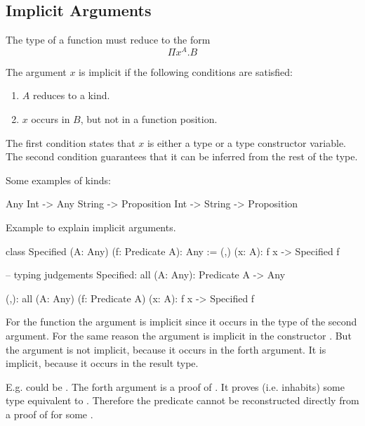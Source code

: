 \subsection{Implicit Arguments}


The type of a function must reduce to the form
$$
    \Pi x^A. B
$$

The argument $x$ is implicit if the following conditions are satisfied:

\begin{enumerate}

\item $A$ reduces to a kind.

\item $x$ occurs in $B$, but not in a function position.
\end{enumerate}

The first condition states that $x$ is either a type or a type constructor
variable. The second condition guarantees that it can be inferred from the rest
of the type.

\noindent Some examples of kinds:
\begin{alba}
    Any
    Int -> Any
    String -> Proposition
    Int -> String -> Proposition
\end{alba}


\noindent Example to explain implicit arguments.
\begin{alba}
class
    Specified (A: Any) (f: Predicate A): Any
:=
    (,) (x: A): f x -> Specified f

-- typing judgements
Specified: all (A: Any): Predicate A -> Any

(,): all (A: Any) (f: Predicate A) (x: A): f x -> Specified f
\end{alba}

For the function  the argument  is implicit since it
occurs in the type of the second argument. For the same reason the argument
 is implicit in the constructor \code{(,)}. But the argument  is
not implicit, because it occurs in the forth argument. It is implicit, because
it occurs in the result type.

E.g.  could be . The forth argument is a proof of
. It proves (i.e. inhabits) some type equivalent to
.  Therefore the predicate  cannot be
reconstructed directly from a proof of  for some .

